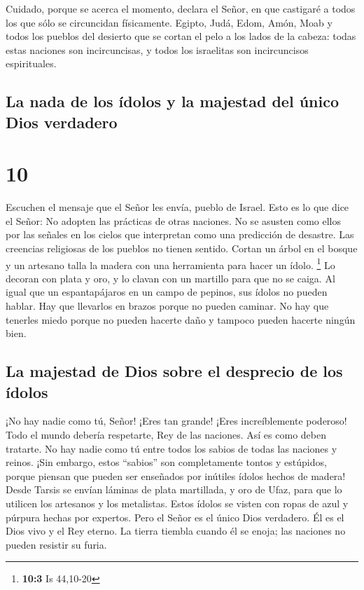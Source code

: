  Cuidado, porque se acerca el momento, declara el Señor,
en que castigaré a todos los que sólo se circuncidan físicamente.
 Egipto, Judá, Edom, Amón, Moab y todos los pueblos del
desierto que se cortan el pelo a los lados de la cabeza: todas estas
naciones son incircuncisas, y todos los israelitas son incircuncisos
espirituales.

\hypertarget{la-nada-de-los-uxeddolos-y-la-majestad-del-uxfanico-dios-verdadero}{%
\subsection{La nada de los ídolos y la majestad del único Dios
verdadero}\label{la-nada-de-los-uxeddolos-y-la-majestad-del-uxfanico-dios-verdadero}}

\hypertarget{section-9}{%
\section{10}\label{section-9}}

 Escuchen el mensaje que el Señor les envía, pueblo de
Israel.  Esto es lo que dice el Señor: No adopten las
prácticas de otras naciones. No se asusten como ellos por las señales en
los cielos que interpretan como una predicción de desastre.
 Las creencias religiosas de los pueblos no tienen
sentido. Cortan un árbol en el bosque y un artesano talla la madera con
una herramienta para hacer un ídolo. \footnote{\textbf{10:3} Is 44,10-20}
 Lo decoran con plata y oro, y lo clavan con un martillo
para que no se caiga.  Al igual que un espantapájaros en
un campo de pepinos, sus ídolos no pueden hablar. Hay que llevarlos en
brazos porque no pueden caminar. No hay que tenerles miedo porque no
pueden hacerte daño y tampoco pueden hacerte ningún bien.

\hypertarget{la-majestad-de-dios-sobre-el-desprecio-de-los-uxeddolos}{%
\subsection{La majestad de Dios sobre el desprecio de los
ídolos}\label{la-majestad-de-dios-sobre-el-desprecio-de-los-uxeddolos}}

 ¡No hay nadie como tú, Señor! ¡Eres tan grande! ¡Eres
increíblemente poderoso!  Todo el mundo debería
respetarte, Rey de las naciones. Así es como deben tratarte. No hay
nadie como tú entre todos los sabios de todas las naciones y reinos.
 ¡Sin embargo, estos ``sabios'' son completamente tontos y
estúpidos, porque piensan que pueden ser enseñados por inútiles ídolos
hechos de madera!  Desde Tarsis se envían láminas de plata
martillada, y oro de Ufaz, para que lo utilicen los artesanos y los
metalistas. Estos ídolos se visten con ropas de azul y púrpura hechas
por expertos.  Pero el Señor es el único Dios verdadero.
Él es el Dios vivo y el Rey eterno. La tierra tiembla cuando él se
enoja; las naciones no pueden resistir su furia.

